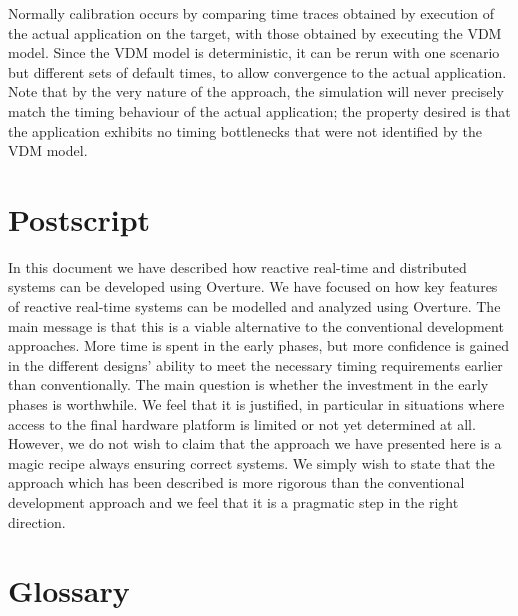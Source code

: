 \documentclass{overturerepchap}
\begin{document}
Normally calibration occurs by comparing time traces obtained by
execution of the actual application on the target, with those obtained
by executing the VDM model.  Since the VDM model is deterministic,
it can be rerun with one scenario but different sets of default times,
to allow convergence to the actual application. Note that by the very
nature of the approach, the simulation will never precisely match the
timing behaviour of the actual application; the property desired is
that the application exhibits no timing bottlenecks that were not
identified by the VDM model.

\chapter{Postscript}\label{chap:postscript}

In this document we have described how reactive real-time and distributed systems can
be developed using Overture. We have focused on how key features of
reactive real-time systems can be modelled and analyzed using
Overture. The main message is that this is a viable alternative to
the conventional development approaches. More time is spent in the
early phases, but more confidence is gained in the different designs'
ability to meet the necessary timing requirements earlier than
conventionally. The main question is whether the investment in the
early phases is worthwhile. We feel that it is justified, in
particular in situations where access to the final hardware platform
is limited or not yet determined at all. However, we do not wish to
claim that the approach we have presented here is a magic recipe
always ensuring correct systems. We simply wish to state that the
approach which has been described is more rigorous than the
conventional development approach and we feel that it is a pragmatic
step in the right direction.

\newpage






\newpage
\appendix


\chapter{Glossary}\label{app:glossary}
\end{document}
